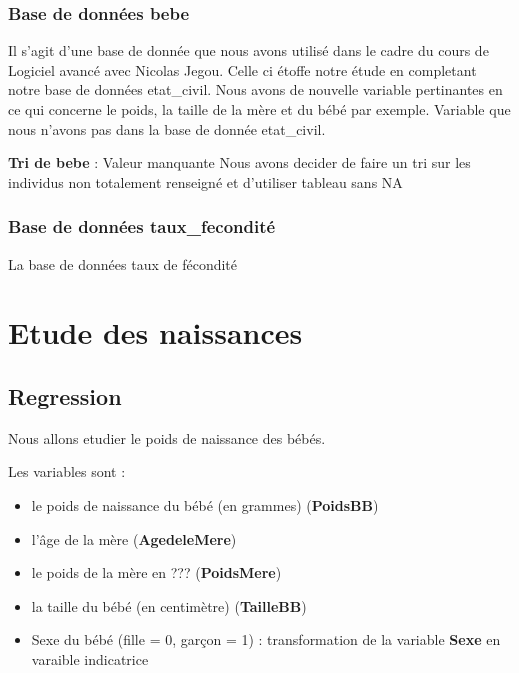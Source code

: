 \documentclass[
]{article}
\begin{document}
\hypertarget{base-de-donnuxe9es-bebe}{%
\subsubsection{Base de données bebe}\label{base-de-donnuxe9es-bebe}}

Il s'agit d'une base de donnée que nous avons utilisé dans le cadre du
cours de Logiciel avancé avec Nicolas Jegou. Celle ci étoffe notre étude
en completant notre base de données etat\_civil. Nous avons de nouvelle
variable pertinantes en ce qui concerne le poids, la taille de la mère
et du bébé par exemple. Variable que nous n'avons pas dans la base de
donnée etat\_civil.

\textbf{Tri de bebe} : Valeur manquante Nous avons decider de faire un
tri sur les individus non totalement renseigné et d'utiliser tableau
sans NA

\hypertarget{base-de-donnuxe9es-taux_fecondituxe9}{%
\subsubsection{Base de données
taux\_fecondité}\label{base-de-donnuxe9es-taux_fecondituxe9}}

La base de données taux de fécondité

\hypertarget{etude-des-naissances}{%
\section{Etude des naissances}\label{etude-des-naissances}}

\hypertarget{regression}{%
\subsection{Regression}\label{regression}}

Nous allons etudier le poids de naissance des bébés.

Les variables sont :

\begin{itemize}
\item
  le poids de naissance du bébé (en grammes) (\textbf{PoidsBB})
\item
  l'âge de la mère (\textbf{AgedeleMere})
\item
  le poids de la mère en ??? (\textbf{PoidsMere})
\item
  la taille du bébé (en centimètre) (\textbf{TailleBB})
\item
  Sexe du bébé (fille = 0, garçon = 1) : transformation de la variable
  \textbf{Sexe} en varaible indicatrice
\end{itemize}
\end{document}
